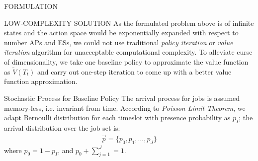 \documentclass[10pt, conference, letterpaper]{IEEEtran}
\begin{document}
\begin{section}{FORMULATION}
    \end{section}

    \begin{section}{LOW-COMPLEXITY SOLUTION}
        \label{sec:algorithm}
        As the formulated problem above is of infinite states and the action space would be exponentially expanded with respect to number APs and ESs, we could not use traditional \emph{policy iteration} or \emph{value iteration} algorithm \cite{sutton1998introduction} for unacceptable computational complexity. To alleviate curse of dimensionality, we take one baseline policy to approximate the value function as $\tilde{V}(T_t)$ and carry out one-step iteration to come up with a better value function approximation.

        \begin{subsection}{Stochastic Process for Baseline Policy}
            The arrival process for jobs is assumed memory-less, i.e. invariant from time. According to \emph{Poisson Limit Theorem}, we adapt Bernoulli distribution for each timeslot with presence probability as $p_I$; the arrival distribution over the job set is:
            \begin{align*}
                \vec{p} = \{ p_0, p_1,\dots,p_J \}
            \end{align*}
            where $p_0=1-p_I$, and $p_0+\sum_{j=1}^{J}=1$.


\end{subsection}
\end{section}
\end{document}
